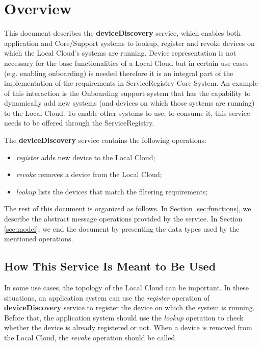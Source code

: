 \documentclass[a4paper]{arrowhead}
\begin{document}
\section{Overview}
\label{sec:overview}
This document describes the \textbf{deviceDiscovery} service, which enables both application and Core/Support systems to lookup, register and revoke devices on which the Local Cloud's systems are running. Device representation is not necessary for the base functionalities of a Local Cloud but in certain use cases (e.g. enabling onboarding) is needed therefore it is an integral part of the implementation of the requirements in ServiceRegistry Core System. An example of this interaction is the Onboarding support system that has the capability to dynamically add new systems (and devices on which those systems are running) to the Local Cloud. To enable other systems to use, to consume it, this service needs to be offered through the ServiceRegistry.

The \textbf{deviceDiscovery} service contains the following operations:

\begin{itemize}
    \item \textit{register} adds new device to the Local Cloud;
    \item \textit{revoke} removes a device from the Local Cloud;
    \item \textit{lookup} lists the devices that match the filtering requirements;
\end{itemize}

The rest of this document is organized as follows.
In Section \ref{sec:functions}, we describe the abstract message operations provided by the service.
In Section \ref{sec:model}, we end the document by presenting the data types used by the mentioned operations.

\subsection{How This Service Is Meant to Be Used}
In some use cases, the topology of the Local Cloud can be important. In these situations, an application system can use the \textit{register} operation of \textbf{deviceDiscovery} service to register the device on which the system is running. Before that, the application system should use the \textit{lookup} operation to check whether the device is already registered or not. When a device is removed from the Local Cloud, the \textit{revoke} operation should be called.
\end{document}
